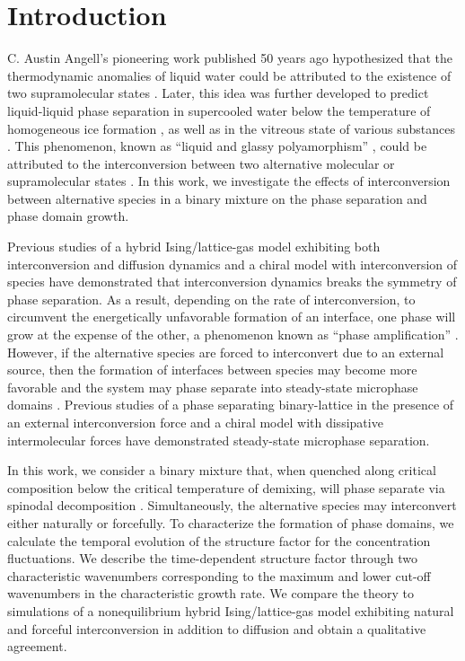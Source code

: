 \documentclass[5p,twocolumn]{elsarticle}
\begin{document}
\section{Introduction}
C. Austin Angell's pioneering work published 50 years ago hypothesized that the thermodynamic anomalies of liquid water could be attributed to the existence of two supramolecular states \cite{Angell_TwoState_1971}. Later, this idea was further developed to predict liquid-liquid phase separation in supercooled water below the temperature of homogeneous ice formation \cite{Angell_Amorphous_2004,Gallo_Tale_2016}, as well as in the vitreous state of various substances \cite{Sastry_Liquid_2003,Xu_Thermodynamics_2006,Bhat_Vitrification_2007,Xu_Monatomic_2009,Lascaris_Search_2014,Lascaris_Diffusivity_2015}. This phenomenon, known as ``liquid and glassy polyamorphism'' \cite{Pool_Polyamorphic_1997,Tanaka_Liquid_2020}, could be attributed to the interconversion between two alternative molecular or supramolecular states \cite{anisimov_thermodynamics_2018}. In this work, we investigate the effects of interconversion between alternative species in a binary mixture on the phase separation and phase domain growth. 

Previous studies of a hybrid Ising/lattice-gas model exhibiting both interconversion and diffusion dynamics \cite{Shum_Phase_2021} and a chiral model with interconversion of species \cite{Petsev_Effect_2021,Uralcan_Interconversion_2020} have demonstrated that interconversion dynamics breaks the symmetry of phase separation. As a result, depending on the rate of interconversion, to circumvent the energetically unfavorable formation of an interface, one phase will grow at the expense of the other, a phenomenon known as ``phase amplification'' \cite{Shum_Phase_2021,MFT_PT_2021}. However, if the alternative species are forced to interconvert due to an external source, then the formation of interfaces between species may become more favorable and the system may phase separate into steady-state microphase domains \cite{MFT_PT_2021}. Previous studies of a phase separating binary-lattice in the presence of an external interconversion force \cite{glotzer_monte_1994,glotzer_reaction-controlled_1995,Christensen_Segregation_1996} and a chiral model with dissipative intermolecular forces \cite{Uralcan_Interconversion_2020} have demonstrated steady-state microphase separation.

In this work, we consider a binary mixture that, when quenched along critical composition below the critical temperature of demixing, will phase separate via spinodal decomposition \cite{cahn_phase_1965}. Simultaneously, the alternative species may interconvert either naturally or forcefully. To characterize the formation of phase domains, we calculate the temporal evolution of the structure factor for the concentration fluctuations. We describe the time-dependent structure factor through two characteristic wavenumbers corresponding to the maximum and lower cut-off wavenumbers in the characteristic growth rate. We compare the theory to simulations of a nonequilibrium hybrid Ising/lattice-gas model exhibiting natural and forceful interconversion in addition to diffusion and obtain a qualitative agreement. 
\end{document}
